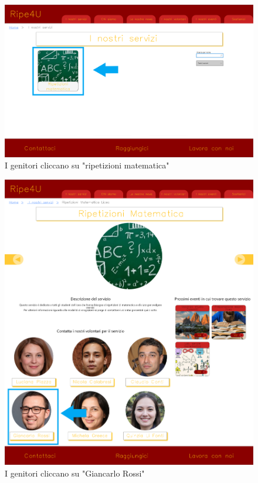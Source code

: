     \begin{figure}[H]
        \centering
        \includegraphics[scale=0.25]{resources/images/scenario1-3.png}
        \caption{I genitori cliccano su "ripetizioni matematica"}
    \end{figure}
    \begin{figure}[H]
        \centering
        \includegraphics[scale=0.25]{resources/images/scenario1-4.png}
        \caption{I genitori cliccano su "Giancarlo Rossi"}
    \end{figure}
